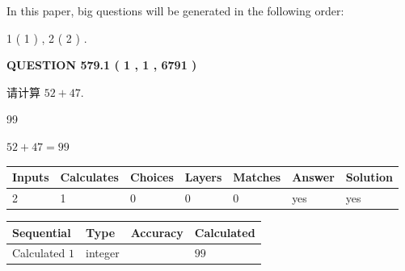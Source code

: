 \documentclass{ctexart}
\begin{document}
   
   
\vspace{0.2in}
   
In this paper, big questions will be generated in the following order: 
   
   
   1 ( 1 )
 ,
   2 ( 2 )
 .
  
\vspace{0.2in}
  
{\textbf{\Large{QUESTION
579.1 
 ( 1 , 1 , 6791 )
}}}
  
  
 
请计算 $ %
52 +  %
47 $.
 
 
 
\noindent{}
 
 

99
 
 
\noindent{}
 
 

 
 
 
\noindent{}
 
 

$ %
52 +  %
47=   %
99$
 
 
\noindent{}
 
 

 
   
   
   
   
\noindent\begin{tabular}{|l|l|l|l|l|l|l|}
 \hline
Inputs & Calculates & Choices & Layers & Matches & Answer & Solution \\ \hline
 2  & 
 1  & 
 0
  & 
 0  & 
 0  & 
  yes & 
  yes 
  \\ \hline
 \end{tabular}
   
   
   
   
\noindent{}
   
   
  
  
\noindent\begin{tabular}{|l|l|l|l|}
\hline
 Sequential & Type & Accuracy & Calculated \\ 
\hline
 
 
  Calculated $  1 $ & integer &  & 
  $ 99 $ 
 \\  \hline  
 \end{tabular}
   
\end{document}
